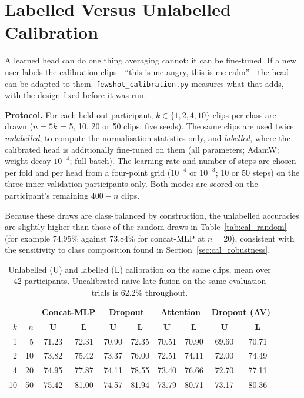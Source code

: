 \section{Labelled Versus Unlabelled Calibration}
\label{sec:cal_labelled}

A learned head can do one thing averaging cannot: it can be fine-tuned. If a new user
labels the calibration clips---``this is me angry, this is me calm''---the head can be
adapted to them. \texttt{fewshot\_calibration.py} measures what that adds, with the
design fixed before it was run.

\textbf{Protocol.} For each held-out participant, $k \in \{1, 2, 4, 10\}$ clips per
class are drawn ($n = 5k$ = 5, 10, 20 or 50 clips; five seeds). The same clips are used
twice: \emph{unlabelled}, to compute the normalisation statistics only, and
\emph{labelled}, where the calibrated head is additionally fine-tuned on them (all
parameters; AdamW; weight decay $10^{-4}$; full batch). The learning rate and number of
steps are chosen per fold and per head from a four-point grid ($10^{-4}$ or $10^{-3}$;
10 or 50 steps) on the three inner-validation participants only. Both modes are scored
on the participant's remaining $400 - n$ clips.

Because these draws are class-balanced by construction, the unlabelled accuracies are
slightly higher than those of the random draws in Table~\ref{tab:cal_random} (for
example 74.95\% against 73.84\% for concat-MLP at $n = 20$), consistent with the
sensitivity to class composition found in Section~\ref{sec:cal_robustness}.

\begin{table}[htbp]
\centering
\small
\caption{Unlabelled (U) and labelled (L) calibration on the same clips, mean over 42
participants. Uncalibrated naive late fusion on the same evaluation trials is 62.2\%
throughout.}
\label{tab:cal_labelled}
\begin{tabular}{rrcccccccc}
\hline
& & \multicolumn{2}{c}{\textbf{Concat-MLP}} & \multicolumn{2}{c}{\textbf{Dropout}} & \multicolumn{2}{c}{\textbf{Attention}} & \multicolumn{2}{c}{\textbf{Dropout (AV)}} \\
\textbf{$k$} & \textbf{$n$} & \textbf{U} & \textbf{L} & \textbf{U} & \textbf{L} & \textbf{U} & \textbf{L} & \textbf{U} & \textbf{L} \\
\hline
1  & 5  & 71.23 & 72.31 & 70.90 & 72.35 & 70.51 & 70.90 & 69.60 & 70.71 \\
2  & 10 & 73.82 & 75.42 & 73.37 & 76.00 & 72.51 & 74.11 & 72.00 & 74.49 \\
4  & 20 & 74.95 & 77.87 & 74.11 & 78.55 & 73.40 & 76.66 & 72.70 & 77.11 \\
10 & 50 & 75.42 & 81.00 & 74.57 & 81.94 & 73.79 & 80.71 & 73.17 & 80.36 \\
\hline
\end{tabular}
\end{table}

